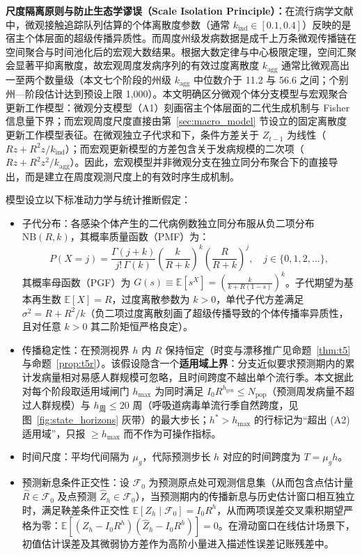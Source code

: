 \documentclass[11pt,a4paper]{article}
\theoremstyle{plain}
\theoremstyle{definition}
\begin{document}
\noindent\textbf{尺度隔离原则与防止生态学谬误（Scale Isolation Principle）：}在流行病学文献中，微观接触追踪队列估算的个体离散度参数（通常 $k_{\text{ind}} \in [0.1, 0.4]$）反映的是宿主个体层面的超级传播异质性\citep{lloyd-smith2005superspreading}。而周度州级发病数据是成千上万条微观传播链在空间聚合与时间池化后的宏观大数结果。根据大数定律与中心极限定理，空间汇聚会显著平抑离散度，故宏观周度发病序列的有效过度离散度 $k_{\text{agg}}$ 通常比微观高出一至两个数量级（本文七个阶段的州级 $k_{\text{agg}}$ 中位数介于 11.2 与 56.6 之间；个别州—阶段估计达到预设上限 1,000）。本文明确区分微观个体分支模型与宏观聚合更新工作模型：微观分支模型（A1）刻画宿主个体层面的二代生成机制与 Fisher 信息量下界；而宏观周度尺度直接由第~\ref{sec:macro_model} 节设立的固定离散度更新工作模型表征。在微观独立子代求和下，条件方差关于 $Z_{t-1}$ 为线性（$Rz + R^2 z / k_{\text{ind}}$）；而宏观更新模型的方差包含关于发病规模的二次项（$Rz + R^2 z^2 / k_{\text{agg}}$）。因此，宏观模型并非微观分支在独立同分布聚合下的直接导出，而是建立在周度观测尺度上的有效时序生成机制。

模型设立以下标准动力学与统计推断假定：
\begin{itemize}
\item[(A1)] 子代分布：各感染个体产生的二代病例数独立同分布服从负二项分布 $\text{NB}(R, k)$，其概率质量函数（PMF）为：
\begin{equation}
P(X = j) = \frac{\Gamma(j+k)}{j!\,\Gamma(k)} \left(\frac{k}{R+k}\right)^k \left(\frac{R}{R+k}\right)^j, \quad j \in \{0, 1, 2, \dots\},
\label{eq:nb_pmf}
\end{equation}
其概率母函数（PGF）为 $G(s) \equiv \mathbb{E}[s^X] = \left(\frac{k}{k + R(1-s)}\right)^k$。子代期望为基本再生数 $\mathbb{E}[X] = R$，过度离散参数为 $k > 0$，单代子代方差满足 $\sigma^2 = R + R^2/k$（负二项过度离散刻画了超级传播导致的个体传播率异质性\citep{lloyd-smith2005superspreading, king2015avoidable}，且对任意 $k > 0$ 其二阶矩恒严格良定）。
\item[(A2)] 传播稳定性：在预测视界 $h$ 内 $R$ 保持恒定（时变与漂移推广见命题~\ref{thm:t5} 与命题~\ref{prop:t5r}）。该假设隐含一个\textbf{适用域上界}：分支近似要求预测期内的累计发病量相对易感人群规模可忽略，且时间跨度不越出单个流行季。本文据此对每个阶段取适用域闸门 $h_{\max}$ 为同时满足 $I_0 R^{h_{\text{gen}}} \le N_{\text{pop}}$（预测周发病量不超过人群规模）与 $h_{\text{周}} \le 20$ 周（呼吸道病毒单流行季自然跨度，见图~\ref{fig:state_horizons} 灰带）的最大步长；$h^* > h_{\max}$ 的行标记为“超出 (A2) 适用域”，只报 $\ge h_{\max}$ 而不作为可操作指标。
\item[(A3)] 时间尺度：平均代间隔为 $\mu_g$，代际预测步长 $h$ 对应的时间跨度为 $T = \mu_g h$。
\item[(A4)] 预测新息条件正交性：设 $\mathcal{F}_0$ 为预测原点处可观测信息集（从而包含点估计量 $\hat{R} \in \mathcal{F}_0$ 及点预测 $\hat{Z}_h \in \mathcal{F}_0$），当预测期内的传播新息与历史估计窗口相互独立时，满足鞅差条件正交性 $\mathbb{E}[Z_h \mid \mathcal{F}_0] = I_0 R^h$，从而两项误差交叉乘积期望严格为零：$\mathbb{E}[(Z_h - I_0 R^h)(\hat{Z}_h - I_0 R^h)] = 0$。在滑动窗口在线估计场景下，初值估计误差及其微弱协方差作为高阶小量进入描述性误差记账残差中。
\end{itemize}
\end{document}
